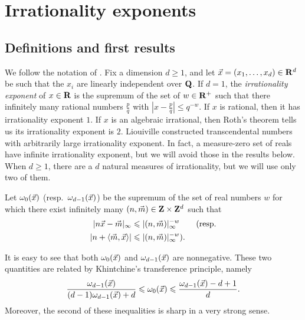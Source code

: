 
\chapter{Irrationality exponents}\label{chapter:irrationality-exponent}





\section{Definitions and first results}

We follow the notation of \cite{laurent-2009}. Fix a dimension 
$d\geqslant 1$, and let $\vec{x}=(x_1,\dots,x_d)\in \mathbf{R}^d$ be such that the $x_i$ 
are linearly independent over $\mathbf{Q}$. If $d = 1$, the \emph{irrationality 
exponent} of $x\in \mathbf{R}$ is the supremum of the set of $w\in \mathbf{R}^+$ such that 
there infinitely many rational numbers $\frac p q$ with 
$\left| x - \frac p q\right| \leqslant q^{-w}$. If $x$ is rational, then it has 
irrationality exponent $1$. If $x$ is an algebraic irrational, then Roth's 
theorem tells us its irrationality exponent is $2$. Liouiville constructed 
transcendental numbers with arbitrarily large irrationality exponent. In fact, 
a measure-zero set of reals have infinite irrationality exponent, but we will 
avoid those in the results below. When $d\geqslant 1$, there are a $d$ natural 
measures of irrationality, but we will use only two of them. 

\begin{definition}\label{def:approx-exp}
Let $\omega_0(\vec{x})$ (resp.~$\omega_{d-1}(\vec{x})$) be the supremum of the set of 
real numbers $w$ for which there exist infinitely many 
$(n,\vec{m})\in \mathbf{Z}\times\mathbf{Z}^d$ such that 
\begin{align*}
	|n \vec{x} - \vec{m}|_\infty 
		&\leqslant |(n,\vec{m})|_\infty^{-w}  \qquad\text{(resp.} \\
	|n +\langle \vec{m},\vec{x}\rangle| 
		&\leqslant |(n,\vec{m})|_\infty^{-w} \text{).}
\end{align*}
\end{definition}

It is easy to see that both $\omega_0(\vec{x})$ and $\omega_{d-1}(\vec{x})$ are 
nonnegative. These two quantities are related by Khintchine's transference 
principle, namely 
\[
	\frac{\omega_{d-1}(\vec{x})}{(d-1) \omega_{d-1}(\vec{x})+d} \leqslant \omega_0(\vec{x}) \leqslant \frac{\omega_{d-1}(\vec{x})-d+1}{d} .
\]
Moreover, the second of these inequalities is sharp in a very strong sense. 

